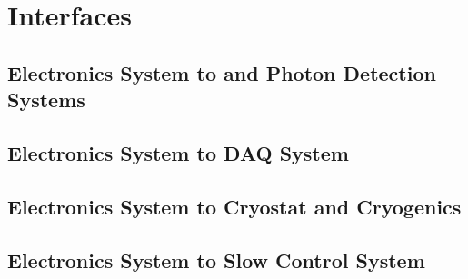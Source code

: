 \section{Interfaces}
\label{sec:dp-tpcelec-intfc}

\subsection{Electronics System to  and Photon Detection Systems}
\label{ssec:dp-tpcelec-intfc-crppmt}

\subsection{Electronics System to DAQ System}
\label{ssec:dp-tpcelec-intfc-daq}

\subsection{Electronics System to Cryostat and Cryogenics}
\label{sec:dp-tpcelec-intfc-cryo}

\subsection{Electronics System to Slow Control System}
\label{sec:dp-tpcelec-intfc-sc}
